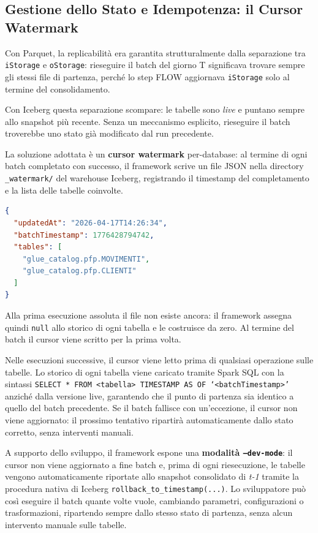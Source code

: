 \documentclass[12pt,a4paper,openright,twoside]{book}
\begin{document}
\subsection{Gestione dello Stato e Idempotenza: il Cursor Watermark}
\label{sec:cursor-watermark}

Con Parquet, la replicabilità era garantita strutturalmente dalla separazione tra \texttt{iStorage} e \texttt{oStorage}: rieseguire il batch del giorno T significava trovare sempre gli stessi file di partenza, perché lo step FLOW aggiornava \texttt{iStorage} solo al termine del consolidamento. 

Con Iceberg questa separazione scompare: le tabelle sono \emph{live} e puntano sempre allo snapshot più recente. Senza un meccanismo esplicito, rieseguire il batch troverebbe uno stato già modificato dal run precedente.

La soluzione adottata è un \textbf{cursor watermark} per-database: al termine di ogni batch completato con successo, il framework scrive un file JSON nella directory \texttt{\_watermark/} del warehouse Iceberg, registrando il timestamp del completamento e la lista delle tabelle coinvolte.

\begin{lstlisting}[language=JSON, caption={Formato del cursor watermark}, label={lst:cursor-watermark}, basicstyle=\footnotesize\ttfamily]
{
  "updatedAt": "2026-04-17T14:26:34",
  "batchTimestamp": 1776428794742,
  "tables": [
    "glue_catalog.pfp.MOVIMENTI",
    "glue_catalog.pfp.CLIENTI"
  ]
}
\end{lstlisting}

Alla prima esecuzione assoluta il file non esiste ancora: il framework assegna quindi \texttt{null} allo storico di ogni tabella e le costruisce da zero. Al termine del batch il cursor viene scritto per la prima volta.

Nelle esecuzioni successive, il cursor viene letto prima di qualsiasi operazione sulle tabelle. Lo storico di ogni tabella viene caricato tramite Spark SQL con la sintassi \texttt{SELECT * FROM <tabella> TIMESTAMP AS OF ‘<batchTimestamp>’} anziché dalla versione live, garantendo che il punto di partenza sia identico a quello del batch precedente. Se il batch fallisce con un’eccezione, il cursor non viene aggiornato: il prossimo tentativo ripartirà automaticamente dallo stato corretto, senza interventi manuali.

A supporto dello sviluppo, il framework espone una \textbf{modalità \texttt{--dev-mode}}: il cursor non viene aggiornato a fine batch e, prima di ogni riesecuzione, le tabelle vengono automaticamente riportate allo snapshot consolidato di \textit{t-1} tramite la procedura nativa di Iceberg \texttt{rollback\_to\_timestamp(...)}.
Lo sviluppatore può così eseguire il batch quante volte vuole, cambiando parametri, configurazioni o trasformazioni, ripartendo sempre dallo stesso stato di partenza, senza alcun intervento manuale sulle tabelle.
\end{document}
